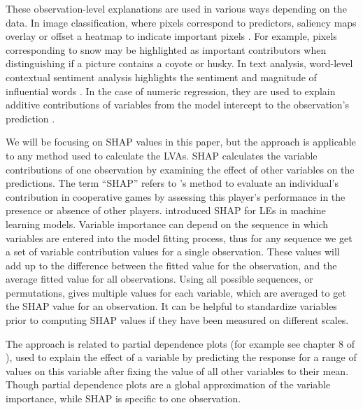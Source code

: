 \documentclass[
]{sn-jnl}
\begin{document}
These observation-level explanations are used in various ways depending
on the data. In image classification, where pixels correspond to
predictors, saliency maps overlay or offset a heatmap to indicate
important pixels \citep{simonyan_deep_2014}. For example, pixels
corresponding to snow may be highlighted as important contributors when
distinguishing if a picture contains a coyote or husky. In text
analysis, word-level contextual sentiment analysis highlights the
sentiment and magnitude of influential words \citep{vanni_textual_2018}.
In the case of numeric regression, they are used to explain additive
contributions of variables from the model intercept to the observation's
prediction \citep{ribeiro_why_2016}.

We will be focusing on SHAP values in this paper, but the approach is
applicable to any method used to calculate the LVAs. SHAP calculates the
variable contributions of one observation by examining the effect of
other variables on the predictions. The term ``SHAP'' refers to
\citet{shapley_value_1953}'s method to evaluate an individual's
contribution in cooperative games by assessing this player's performance
in the presence or absence of other players.
\citet{strumbelj_efficient_2010} introduced SHAP for LEs in machine
learning models. Variable importance can depend on the sequence in which
variables are entered into the model fitting process, thus for any
sequence we get a set of variable contribution values for a single
observation. These values will add up to the difference between the
fitted value for the observation, and the average fitted value for all
observations. Using all possible sequences, or permutations, gives
multiple values for each variable, which are averaged to get the SHAP
value for an observation. It can be helpful to standardize variables
prior to computing SHAP values if they have been measured on different
scales.

The approach is related to partial dependence plots (for example see
chapter 8 of \citet{molnar2022}), used to explain the effect of a
variable by predicting the response for a range of values on this
variable after fixing the value of all other variables to their mean.
Though partial dependence plots are a global approximation of the
variable importance, while SHAP is specific to one observation.
\end{document}
